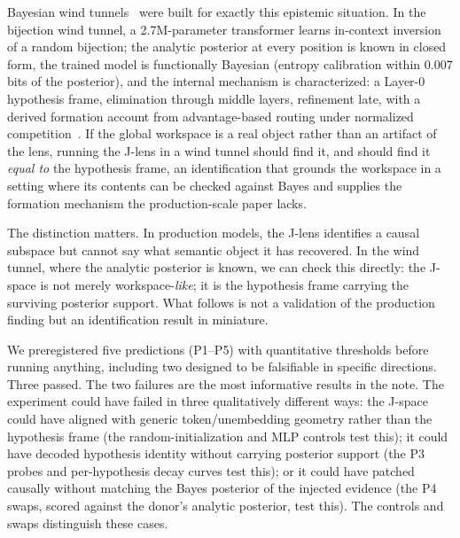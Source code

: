 \documentclass[11pt]{article}
\newcommand{\Jspace}{J\mbox{-}space}
\begin{document}
Bayesian wind tunnels~\citep{agarwal2026windtunnel} were built for exactly
this epistemic situation. In the bijection wind tunnel, a 2.7M-parameter
transformer learns in-context inversion of a random bijection; the
analytic posterior at every position is known in closed form, the trained
model is functionally Bayesian (entropy calibration within $0.007$ bits of
the posterior), and the internal mechanism is characterized: a Layer-0
hypothesis frame, elimination through middle layers, refinement late, with
a derived formation account from advantage-based routing under normalized
competition~\citep{agarwal2026gradient}. If the global workspace is a real
object rather than an artifact of the lens, running the J-lens in a wind
tunnel should find it, and should find it \emph{equal to} the hypothesis
frame, an identification that grounds the workspace in a setting where
its contents can be checked against Bayes and supplies the formation
mechanism the production-scale paper lacks.

The distinction matters. In production
models, the J-lens identifies a causal subspace but cannot say what
semantic object it has recovered. In the wind tunnel, where the analytic
posterior is known, we can check this directly: the \Jspace{} is not
merely workspace-\emph{like}; it is the hypothesis frame carrying the
surviving posterior support. What follows is not a validation of the
production finding but an identification result in miniature.

We preregistered five predictions (P1--P5) with quantitative thresholds
before running anything, including two designed to be falsifiable in
specific directions. Three passed. The two failures are the most
informative results in the note. The experiment could have failed in
three qualitatively different ways: the \Jspace{} could have aligned
with generic token/unembedding geometry rather than the hypothesis frame
(the random-initialization and MLP controls test this); it could have
decoded hypothesis identity without carrying posterior support (the P3
probes and per-hypothesis decay curves test this); or it could have
patched causally without matching the Bayes posterior of the injected
evidence (the P4 swaps, scored against the donor's analytic posterior,
test this). The controls and swaps distinguish these cases.
\end{document}
